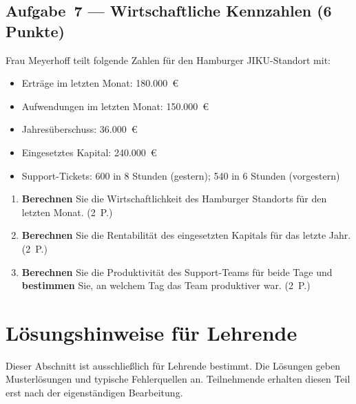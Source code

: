 \documentclass[11pt, a4paper]{article}
\begin{document}
\subsection*{Aufgabe~7 --- Wirtschaftliche Kennzahlen (6 Punkte)}

Frau Meyerhoff teilt folgende Zahlen für den Hamburger JIKU-Standort mit:
\begin{itemize}
  \item Erträge im letzten Monat: 180.000~€
  \item Aufwendungen im letzten Monat: 150.000~€
  \item Jahresüberschuss: 36.000~€
  \item Eingesetztes Kapital: 240.000~€
  \item Support-Tickets: 600 in 8 Stunden (gestern); 540 in 6 Stunden (vorgestern)
\end{itemize}

\begin{enumerate}[label=(\alph*)]
  \item \textbf{Berechnen} Sie die Wirtschaftlichkeit des Hamburger Standorts für den
  letzten Monat. \hfill (2~P.)

  \vspace{3.5cm}

  \item \textbf{Berechnen} Sie die Rentabilität des eingesetzten Kapitals für das letzte
  Jahr. \hfill (2~P.)

  \vspace{3.5cm}

  \item \textbf{Berechnen} Sie die Produktivität des Support-Teams für beide Tage und
  \textbf{bestimmen} Sie, an welchem Tag das Team produktiver war. \hfill (2~P.)

  \vspace{4cm}
\end{enumerate}

\newpage
\section*{Lösungshinweise für Lehrende}
\label{loesungen}

\begin{merksatz}[title={\bfseries Hinweis zur Nutzung}]
Dieser Abschnitt ist ausschließlich für Lehrende bestimmt. Die Lösungen geben
Musterlösungen und typische Fehlerquellen an. Teilnehmende erhalten diesen Teil
erst nach der eigenständigen Bearbeitung.
\end{merksatz}
\end{document}
